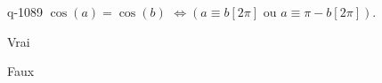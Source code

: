 \begin{truefalse}{q-1089}
$\cos(a)=\cos(b)$  $\Leftrightarrow \left(a\equiv b [2\pi]\text{ ou } a\equiv \pi-b [2\pi]\right)$.
\item Vrai
\item* Faux
\end{truefalse}

